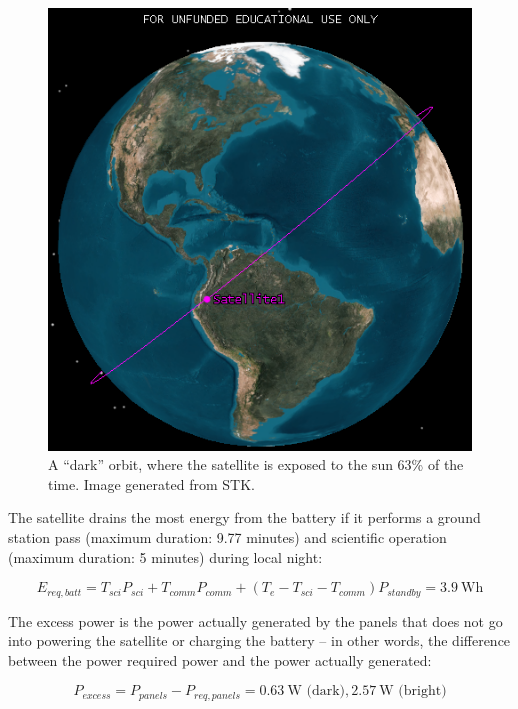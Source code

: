 \documentclass[12pt]{article}
\begin{document}
\begin{figure}[ht]%
\centering
\includegraphics{images/power-dark-orbit}%
\caption{A ``dark'' orbit, where the satellite is exposed to the sun 63\% of the time.  Image generated from STK.}%
\label{fig:power-dark-orbit}%
\end{figure}

The satellite drains the most energy from the battery if it performs a ground station pass (maximum duration: 9.77 minutes) and scientific operation (maximum duration: 5 minutes) during local night:

\begin{equation}
E_{req,batt} = T_{sci} P_{sci} + T_{comm} P_{comm} + (T_e - T_{sci} - T_{comm}) P_{standby} = 3.9 \ \text{Wh}
\label{eq:power-batt-req}
\end{equation}

The excess power is the power actually generated by the panels that does not go into powering the satellite or charging the battery -- in other words, the difference between the power required power and the power actually generated:

\begin{equation}
P_{excess} = P_{panels} - P_{req,panels} = 0.63 \ \text{W (dark)}, 2.57 \ \text{W (bright)}
\label{eq:power-excess}
\end{equation}
\end{document}
